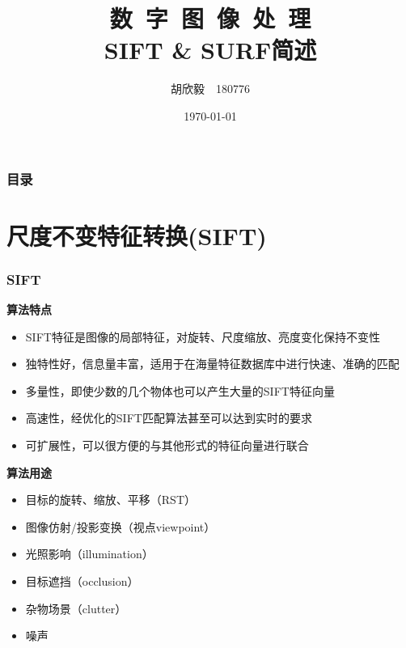 \documentclass[presentation,aspectratio=1610]{beamer}
\title[SIFT \& SURF]{~数~字~图~像~处~理~ \\ SIFT \& SURF简述}
\author[胡欣毅]{胡欣毅　180776 }
\date[\today]{\today}
\institute[Coventry] 
{
\small 信息科学与工程学院 \\
\medskip
icedomain\_hu@qq.com

	\begin{flushright}
		2组组长:卞慧	  \\ 
		胡欣毅\qquad \hspace{.02cm}  陈康 \quad  张可涵 \\ 
		包雅孟	 \quad 周京鹏 \quad  郝培钧
	\end{flushright}
}
\begin{document}
\begin{frame}
\titlepage 
\end{frame}

\begin{frame}
\frametitle{目录} 
\tableofcontents

\end{frame}


\section[SIFT]{尺度不变特征转换(SIFT)}

\begin{frame}
\frametitle{SIFT}
	\begin{block}{\textbf{算法特点}}
		\begin{itemize}
			\item SIFT特征是图像的局部特征，对旋转、尺度缩放、亮度变化保持不变性
			\item 独特性好，信息量丰富，适用于在海量特征数据库中进行快速、准确的匹配
			\item 多量性，即使少数的几个物体也可以产生大量的SIFT特征向量
			\item 高速性，经优化的SIFT匹配算法甚至可以达到实时的要求
			\item 可扩展性，可以很方便的与其他形式的特征向量进行联合
		\end{itemize}
	\end{block} \pause
	
	\begin{block}{\textbf{算法用途}}
		\begin{itemize}
			\item 目标的旋转、缩放、平移（RST）			
			\item 图像仿射/投影变换（视点viewpoint）			
			\item 光照影响（illumination）			
			\item 目标遮挡（occlusion）			
			\item 杂物场景（clutter）			
			\item 噪声
		\end{itemize}
	\end{block}
	
\end{frame}
\end{document}
